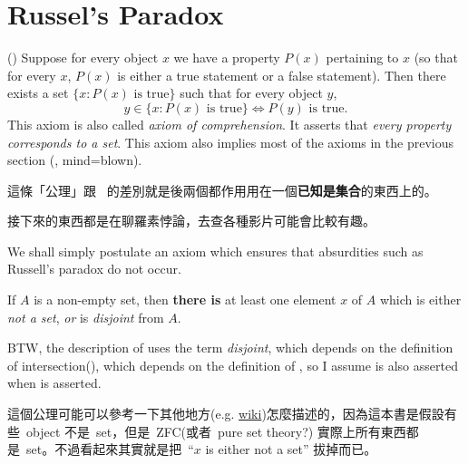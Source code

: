 \section{Russel's Paradox}\label{sec 3.2}

\begin{axiom}  \label{axm 3.8} ()
Suppose for every object \(x\) we have a property \(P(x)\) pertaining to \(x\) (so that for every \(x\), \(P(x)\) is either a true statement or a false statement).
Then there exists a set \( \{x : P(x) \text{\ is true} \} \) such that for every object \(y\),
\[
    y \in \{x : P(x) \text{\ is true} \} \iff P(y) \text{\ is true}.
\]
This axiom is also called \emph{axiom of comprehension}.
It asserts that \emph{every property corresponds to a set}.
This axiom also implies most of the axioms in the previous section (, mind=blown).
\end{axiom}

\begin{note}
這條「公理」跟\   的差別就是後兩個都作用用在一個\textbf{已知是集合}的東西上的。
\end{note}

\begin{note}
接下來的東西都是在聊羅素悖論，去查各種影片可能會比較有趣。
\end{note}

\begin{note}
We shall simply postulate an axiom which ensures that absurdities such as Russell’s paradox do not occur.
\end{note}

\begin{axiom} \label{axm 3.9}
If \(A\) is a non-empty set, then \textbf{there is} at least one element \(x\) of \(A\) which is either \textit{not a set}, \textit{or} is \textit{disjoint} from \(A\).
\end{axiom}

\begin{note}
BTW, the description of  uses the term \emph{disjoint}, which depends on the definition of intersection(), which depends on the definition of , so I assume  is also asserted when  is asserted.
\end{note}

\begin{note}
這個公理可能可以參考一下其他地方(e.g. \href{https://www.wikiwand.com/en/Axiom_of_regularity}{wiki})怎麼描述的，因為這本書是假設有些\ object 不是\ set，但是\ ZFC(或者\ pure set theory?) 實際上所有東西都是\ set。不過看起來其實就是把\ ``\(x\) is either not a set'' 拔掉而已。
\end{note}

